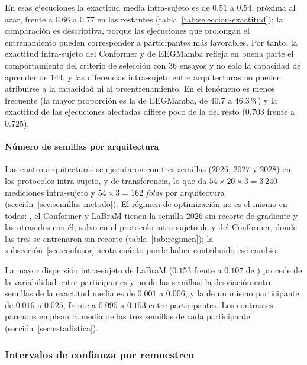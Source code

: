 En esas ejecuciones la exactitud media intra-sujeto es de $0.51$ a $0.54$, próxima al azar, frente a
$0.66$ a $0.77$ en las restantes (tabla~\ref{tab:seleccion-exactitud}); la comparación es descriptiva,
porque las ejecuciones que prolongan el entrenamiento pueden corresponder a participantes más
favorables. Por tanto, la exactitud intra-sujeto del Conformer y de EEGMamba refleja en buena parte el
comportamiento del criterio de selección con $36$ ensayos y no solo la capacidad de aprender de $144$,
y las diferencias intra-sujeto entre arquitecturas no pueden atribuirse a la capacidad ni al
preentrenamiento. En \loso{} el fenómeno es menos frecuente (la mayor proporción es la de EEGMamba,
de $40.7$ a $46.3$\,\%) y la exactitud de las ejecuciones afectadas difiere poco de la del resto
($0.703$ frente a $0.725$).

\paragraph{Número de semillas por arquitectura}
\label{sec:semillas-por-arq}

Las cuatro arquitecturas se ejecutaron con tres semillas ($2026$, $2027$ y $2028$) en los protocolos
intra-sujeto, \loso{} y de transferencia, lo que da $54 \times 20 \times 3 = 3\,240$ mediciones
intra-sujeto y $54 \times 3 = 162$ \textit{folds} \loso{} por arquitectura
(sección~\ref{sec:semillas-metodo}). El régimen de optimización no es el mismo en todas: \eegnet{}, el
Conformer y LaBraM tienen la semilla $2026$ sin recorte de gradiente y las otras dos con él, salvo en el
protocolo intra-sujeto de \eegnet{} y del Conformer, donde las tres se entrenaron sin recorte
(tabla~\ref{tab:regimen}); la subsección~\ref{sec:confusor} acota cuánto puede haber contribuido ese cambio.

La mayor dispersión intra-sujeto de LaBraM ($0.153$ frente a $0.107$ de \eegnet{}) procede de la
variabilidad entre participantes y no de las semillas: la desviación entre semillas de la exactitud media
es de $0.001$ a $0.006$, y la de un mismo participante de $0.016$ a $0.025$, frente a $0.095$ a $0.153$
entre participantes. Los contrastes pareados emplean la media de las tres semillas de cada participante
(sección~\ref{sec:estadistica}).

\subsubsection{Intervalos de confianza por remuestreo}
\label{sec:bootstrap-resultados}

